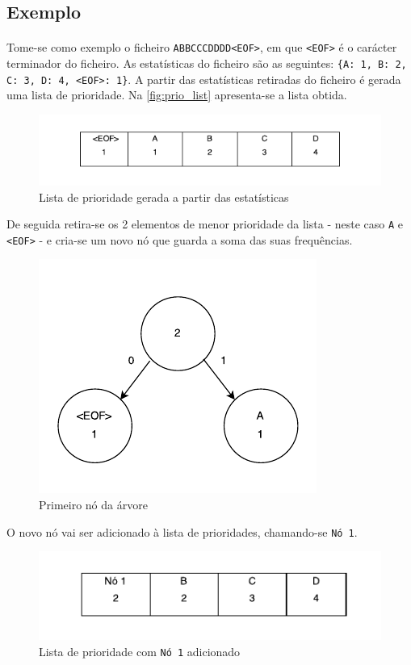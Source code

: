 \subsection{Exemplo}

\paragraph{} Tome-se como exemplo o ficheiro \texttt{ABBCCCDDDD<EOF>}, em que \texttt{<EOF>} é o carácter terminador do ficheiro. As estatísticas do ficheiro são as seguintes: \texttt{\{A: 1, B: 2, C: 3, D: 4, <EOF>: 1\}}. A partir das estatísticas retiradas do ficheiro é gerada uma lista de prioridade. Na \autoref{fig:prio_list} apresenta-se a lista obtida.

\begin{figure}[H]
  \centering
  \includegraphics[width=.65\textwidth]{img/prio_list}
  \caption{Lista de prioridade gerada a partir das estatísticas}
  \label{fig:prio_list}
\end{figure}

De seguida retira-se os 2 elementos de menor prioridade da lista - neste caso \texttt{A} e \texttt{<EOF>} - e cria-se um novo nó que guarda a soma das suas frequências.

\begin{figure}[H]
  \centering
  \includegraphics[width=.5\textwidth]{img/trie_1}
  \caption{Primeiro nó da árvore}
  \label{fig:trie_1}
\end{figure}

O novo nó vai ser adicionado à lista de prioridades, chamando-se \texttt{Nó 1}.

\begin{figure}[H]
  \centering
  \includegraphics[width=.65\textwidth]{img/prio_list_2}
  \caption{Lista de prioridade com \texttt{Nó 1} adicionado}
  \label{fig:prio_list_2}
\end{figure}

